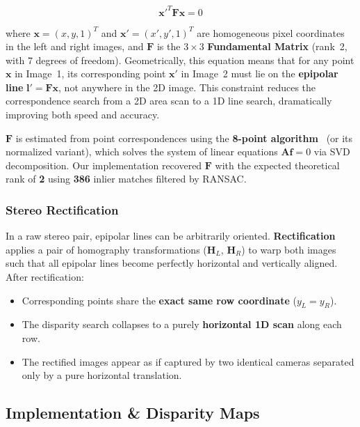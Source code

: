 \documentclass[a4paper,12pt]{article}
\begin{document}
\begin{equation}
    \mathbf{x'}^T \mathbf{F} \mathbf{x} = 0
\end{equation}

where $\mathbf{x} = (x, y, 1)^T$ and $\mathbf{x'} = (x', y', 1)^T$ are homogeneous pixel coordinates in the left and right images, and $\mathbf{F}$ is the $3 \times 3$ \textbf{Fundamental Matrix} (rank~2, with 7 degrees of freedom). Geometrically, this equation means that for any point $\mathbf{x}$ in Image~1, its corresponding point $\mathbf{x'}$ in Image~2 must lie on the \textbf{epipolar line} $\mathbf{l'} = \mathbf{F} \mathbf{x}$, not anywhere in the 2D image. This constraint reduces the correspondence search from a 2D area scan to a 1D line search, dramatically improving both speed and accuracy.

$\mathbf{F}$ is estimated from point correspondences using the \textbf{8-point algorithm}~\cite{longuet1981computer} (or its normalized variant), which solves the system of linear equations $\mathbf{A} \mathbf{f} = 0$ via SVD decomposition. Our implementation recovered $\mathbf{F}$ with the expected theoretical rank of \textbf{2} using \textbf{386} inlier matches filtered by RANSAC.

\subsubsection{Stereo Rectification}

In a raw stereo pair, epipolar lines can be arbitrarily oriented. \textbf{Rectification} applies a pair of homography transformations ($\mathbf{H}_L$, $\mathbf{H}_R$) to warp both images such that all epipolar lines become perfectly horizontal and vertically aligned. After rectification:
\begin{itemize}
    \item Corresponding points share the \textbf{exact same row coordinate} ($y_L = y_R$).
    \item The disparity search collapses to a purely \textbf{horizontal 1D scan} along each row.
    \item The rectified images appear as if captured by two identical cameras separated only by a pure horizontal translation.
\end{itemize}

\subsection{Implementation \& Disparity Maps}
\end{document}
